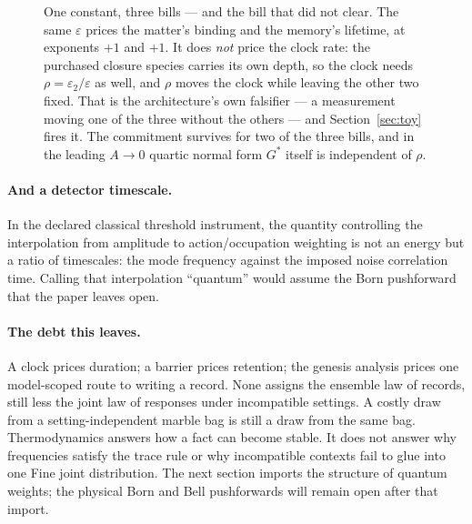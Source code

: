 \documentclass[11pt,a4paper]{article}
\newcommand{\Gstar}{{G^{*}}}
\newcommand{\figsub}{\scriptsize}
\theoremstyle{definition}
\theoremstyle{plain}
\theoremstyle{remark}
\begin{document}
\begin{figure}[t]
\centering
{}
\caption{One constant, three bills --- and the bill that did not clear.
The same $\varepsilon$ prices the matter's binding and the memory's
lifetime, at exponents $+1$ and $+1$. It does \emph{not} price the clock
rate: the purchased closure species carries its own depth, so the clock
needs $\rho=\varepsilon_2/\varepsilon$ as well, and $\rho$ moves the
clock while leaving the other two fixed. That is the architecture's own
falsifier --- a measurement moving one of the three without the others
--- and Section~\ref{sec:toy} fires it. The commitment survives for two
of the three bills, and in the leading $A\to0$ quartic normal form
$\Gstar$ itself is independent of $\rho$.}
\label{fig:epsilon}
\end{figure}

\paragraph{And a detector timescale.} In the declared classical threshold
instrument, the quantity controlling the interpolation from amplitude to
action/occupation weighting is not an energy but a ratio of timescales:
the mode frequency against the imposed noise correlation time. Calling
that interpolation ``quantum'' would assume the Born pushforward that the
paper leaves open.

\paragraph{The debt this leaves.} A clock prices duration; a barrier prices
retention; the genesis analysis prices one model-scoped route to writing a
record. None assigns the ensemble law of records, still less the joint law
of responses under incompatible settings. A costly draw from a
setting-independent marble bag is still a draw from the same bag.
Thermodynamics answers how a fact can become stable. It does not answer why
frequencies satisfy the trace rule or why incompatible contexts fail to
glue into one Fine joint distribution. The next section imports the
structure of quantum weights; the physical Born and Bell pushforwards will
remain open after that import.
\end{document}
